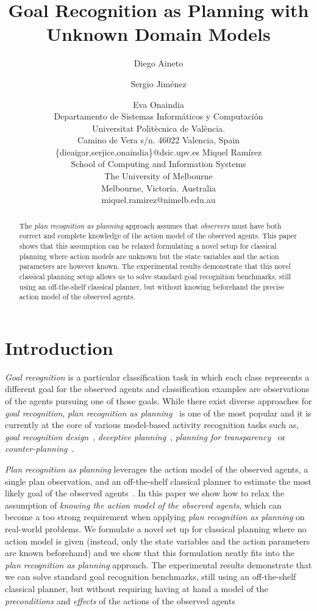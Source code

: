 \documentclass[letterpaper]{article} %
\title{Goal Recognition as Planning with Unknown Domain Models}
\author{Diego Aineto \and Sergio Jim\'enez\and Eva Onaindia\\
{\scriptsize Departamento de Sistemas Inform\'aticos y Computaci\'on}\\
{\scriptsize Universitat Polit\`ecnica de Val\`encia.}\\
{\scriptsize Camino de Vera s/n. 46022 Valencia, Spain}\\
{\scriptsize \{dieaigar,serjice,onaindia\}@dsic.upv.es}
\And Miquel Ram\'irez\\
{\scriptsize School of Computing and Information Systems}\\
{\scriptsize The University of Melbourne}\\
{\scriptsize Melbourne, Victoria. Australia}\\
{\scriptsize miquel.ramirez@nimelb.edu.au}}
\begin{document}
\maketitle
\begin{abstract}
The {\em plan recognition as planning} approach assumes that {\em observers} must have both correct and complete knowledge of the action model of the observed agents. This paper shows that this assumption can be relaxed formulating a novel setup for classical planning where action models are unknown but the state variables and the action parameters are however known. The experimental results demonstrate that this novel classical planning setup allows us to solve standard goal recognition benchmarks, still using an off-the-shelf classical planner, but without knowing beforehand the precise action model of the observed agents. 
\end{abstract}

\section{Introduction}
\label{sec:introduction}
{\em Goal recognition} is a particular classification task in which each class represents a different goal for the observed agents and classification examples are observations of the agents pursuing one of those goals. While there exist diverse approaches for {\em goal recognition}, {\em plan recognition as planning}~\cite{ramirez2009plan,ramirez2010probabilistic} is one of the most popular and it is currently at the core of various model-based activity recognition tasks such as, {\em goal recognition design}~\cite{KerenGK14}, {\em deceptive planning}~\cite{masters2017deceptive}, {\em planning for transparency}~\cite{macnally2018action} or {\em counter-planning}~\cite{PozancoEFB18}.

{\em Plan recognition as planning} leverages the action model of the observed agents, a single plan observation, and an off-the-shelf classical planner to estimate the most likely goal of the observed agents~\cite{ramirez2012plan}. In this paper we show how to relax the assumption of {\em knowing the action model of the observed agents}, which can become a too strong requirement when applying {\em plan recognition as planning} on real-world problems.  We formulate a novel set up for classical planning where no action model is given (instead, only the state variables and the action parameters are known beforehand) and we show that this formulation neatly fits into the {\em plan recognition as planning} approach. The experimental results demonstrate that we can solve standard goal recognition benchmarks, still using an off-the-shelf classical planner, but without requiring having at hand a model of the {\em preconditions} and {\em effects} of the actions of the observed agents 
\end{document}
